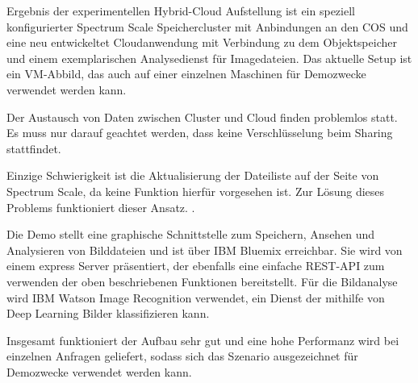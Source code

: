 Ergebnis der experimentellen Hybrid-Cloud Aufstellung ist ein speziell konfigurierter Spectrum Scale Speichercluster mit Anbindungen an den \ac{COS} und eine neu entwickeltet Cloudanwendung mit Verbindung zu dem Objektspeicher und einem exemplarischen Analysedienst für Imagedateien.
Das aktuelle Setup ist ein VM-Abbild, das auch auf einer einzelnen Maschinen für Demozwecke verwendet werden kann.

Der Austausch von Daten zwischen Cluster und Cloud finden problemlos statt. Es muss nur darauf geachtet werden, dass keine Verschlüsselung beim Sharing stattfindet.

Einzige Schwierigkeit ist die Aktualisierung der Dateiliste auf der Seite von Spectrum Scale, da keine Funktion hierfür vorgesehen ist. Zur Lösung dieses Problems funktioniert dieser Ansatz. .

Die Demo stellt eine graphische Schnittstelle zum Speichern, Ansehen und Analysieren von Bilddateien und ist über IBM Bluemix erreichbar. Sie wird von einem express Server präsentiert, der ebenfalls eine einfache REST-API zum verwenden der oben beschriebenen Funktionen bereitstellt. Für die Bildanalyse wird IBM Watson Image Recognition verwendet, ein Dienst der mithilfe von Deep Learning Bilder klassifizieren kann.

Insgesamt funktioniert der Aufbau sehr gut und eine hohe Performanz wird bei einzelnen Anfragen geliefert, sodass sich das Szenario ausgezeichnet für Demozwecke verwendet werden kann.